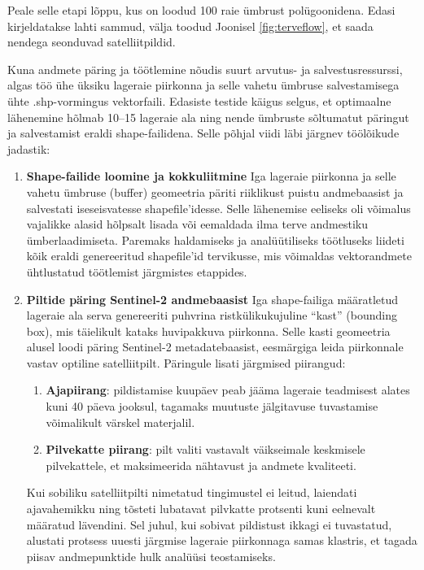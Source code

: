 Peale selle etapi lõppu, kus on loodud 100 raie ümbrust polügoonidena. Edasi kirjeldatakse lahti sammud, välja toodud Joonisel \ref{fig:terveflow}, et saada nendega seonduvad satelliitpildid.

Kuna andmete päring ja töötlemine nõudis suurt arvutus- ja salvestusressurssi,
algas töö ühe üksiku lageraie piirkonna ja selle vahetu ümbruse salvestamisega
ühte .shp-vormingus vektorfaili. Edasiste testide käigus selgus, et optimaalne
lähenemine hõlmab 10--15 lageraie ala ning nende ümbruste sõltumatut päringut ja
salvestamist eraldi shape-failidena. Selle põhjal viidi läbi järgnev töölõikude
jadastik:
\begin{enumerate}[topsep=1pt,itemsep=1ex,partopsep=1ex,parsep=1ex]

\item \textbf{Shape-failide loomine ja kokkuliitmine}\newline
Iga lageraie piirkonna ja selle vahetu
ümbruse (buffer) geomeetria päriti riiklikust puistu andmebaasist ja salvestati
iseseisvatesse shapefile'idesse. Selle lähenemise eeliseks oli võimalus
vajalikke alasid hõlpsalt lisada või eemaldada ilma terve andmestiku
ümberlaadimiseta. Paremaks haldamiseks ja analüütiliseks töötluseks liideti kõik
eraldi genereeritud shapefile'id  tervikusse, mis võimaldas
vektorandmete ühtlustatud töötlemist järgmistes etappides.

\item \textbf{Piltide päring Sentinel-2 andmebaasist} \newline
Iga shape-failiga määratletud lageraie
ala serva genereeriti puhvrina ristkülikukujuline ``kast'' (bounding box), mis
täielikult kataks huvipakkuva piirkonna. Selle kasti geomeetria alusel loodi
päring Sentinel-2 metadatebaasist, eesmärgiga leida piirkonnale vastav optiline
satelliitpilt. Päringule lisati järgmised piirangud:

\begin{enumerate}

\item \textbf{Ajapiirang}: pildistamise kuupäev peab jääma lageraie teadmisest alates kuni 40
päeva jooksul, tagamaks muutuste jälgitavuse tuvastamise võimalikult värskel
materjalil.

\item \textbf{Pilvekatte piirang}: pilt valiti vastavalt väikseimale keskmisele pilvekattele,
et maksimeerida nähtavust ja andmete kvaliteeti.
\end{enumerate}

Kui sobiliku satelliitpilti nimetatud tingimustel ei leitud,
laiendati ajavahemikku ning tõsteti lubatavat pilvkatte protsenti kuni eelnevalt
määratud lävendini. Sel juhul, kui sobivat pildistust ikkagi ei tuvastatud,
alustati protsess uuesti järgmise lageraie piirkonnaga samas klastris, et tagada
piisav andmepunktide hulk analüüsi teostamiseks.


\end{enumerate}
